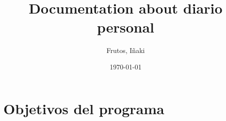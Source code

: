 \documentclass[12pt]{article}
\title{Documentation about diario personal}
\author{Frutos, I\~{n}aki}
\date{\today}
\begin{document}
\maketitle
\tableofcontents

\section{Objetivos del programa}
\end{document}
